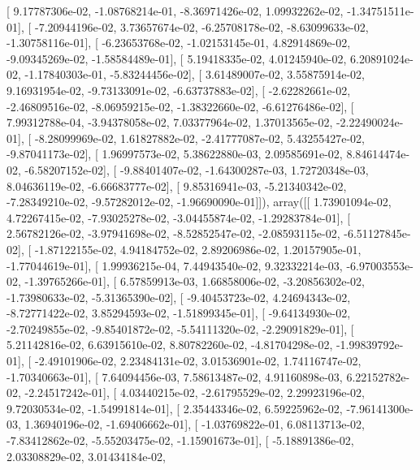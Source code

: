 \documentclass{article}
\begin{document}
       [  9.17787306e-02,  -1.08768214e-01,  -8.36971426e-02,
          1.09932262e-02,  -1.34751511e-01],
       [ -7.20944196e-02,   3.73657674e-02,  -6.25708178e-02,
         -8.63099633e-02,  -1.30758116e-01],
       [ -6.23653768e-02,  -1.02153145e-01,   4.82914869e-02,
         -9.09345269e-02,  -1.58584489e-01],
       [  5.19418335e-02,   4.01245940e-02,   6.20891024e-02,
         -1.17840303e-01,  -5.83244456e-02],
       [  3.61489007e-02,   3.55875914e-02,   9.16931954e-02,
         -9.73133091e-02,  -6.63737883e-02],
       [ -2.62282661e-02,  -2.46809516e-02,  -8.06959215e-02,
         -1.38322660e-02,  -6.61276486e-02],
       [  7.99312788e-04,  -3.94378058e-02,   7.03377964e-02,
          1.37013565e-02,  -2.22490024e-01],
       [ -8.28099969e-02,   1.61827882e-02,  -2.41777087e-02,
          5.43255427e-02,  -9.87041173e-02],
       [  1.96997573e-02,   5.38622880e-03,   2.09585691e-02,
          8.84614474e-02,  -6.58207152e-02],
       [ -9.88401407e-02,  -1.64300287e-03,   1.72720348e-03,
          8.04636119e-02,  -6.66683777e-02],
       [  9.85316941e-03,  -5.21340342e-02,  -7.28349210e-02,
         -9.57282012e-02,  -1.96690090e-01]]), array([[  1.73901094e-02,   4.72267415e-02,  -7.93025278e-02,
         -3.04455874e-02,  -1.29283784e-01],
       [  2.56782126e-02,  -3.97941698e-02,  -8.52852547e-02,
         -2.08593115e-02,  -6.51127845e-02],
       [ -1.87122155e-02,   4.94184752e-02,   2.89206986e-02,
          1.20157905e-01,  -1.77044619e-01],
       [  1.99936215e-04,   7.44943540e-02,   9.32332214e-03,
         -6.97003553e-02,  -1.39765266e-01],
       [  6.57859913e-03,   1.66858006e-02,  -3.20856302e-02,
         -1.73980633e-02,  -5.31365390e-02],
       [ -9.40453723e-02,   4.24694343e-02,  -8.72771422e-02,
          3.85294593e-02,  -1.51899345e-01],
       [ -9.64134930e-02,  -2.70249855e-02,  -9.85401872e-02,
         -5.54111320e-02,  -2.29091829e-01],
       [  5.21142816e-02,   6.63915610e-02,   8.80782260e-02,
         -4.81704298e-02,  -1.99839792e-01],
       [ -2.49101906e-02,   2.23484131e-02,   3.01536901e-02,
          1.74116747e-02,  -1.70340663e-01],
       [  7.64094456e-03,   7.58613487e-02,   4.91160898e-03,
          6.22152782e-02,  -2.24517242e-01],
       [  4.03440215e-02,  -2.61795529e-02,   2.29923196e-02,
          9.72030534e-02,  -1.54991814e-01],
       [  2.35443346e-02,   6.59225962e-02,  -7.96141300e-03,
          1.36940196e-02,  -1.69406662e-01],
       [ -1.03769822e-01,   6.08113713e-02,  -7.83412862e-02,
         -5.55203475e-02,  -1.15901673e-01],
       [ -5.18891386e-02,   2.03308829e-02,   3.01434184e-02,
\end{document}
